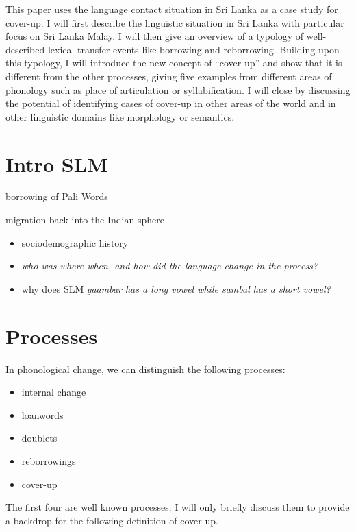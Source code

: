 \documentclass[a4paper,10pt]{article}
\begin{document}
This paper uses the language contact situation in Sri Lanka as a case study for cover-up.
I will first describe the linguistic situation in Sri Lanka with particular focus on Sri Lanka Malay. 
I will then give an overview of a typology of well-described lexical transfer events like borrowing and reborrowing. 
Building upon this typology, I will introduce the new concept of ``cover-up'' and show that it is different from the other processes, giving five examples from different areas of phonology such as place of articulation or syllabification. 
I will close by discussing the potential of identifying cases of cover-up in other areas of the world and in other  linguistic domains like morphology or semantics. 



 

\section{Intro SLM}
borrowing of Pali Words

migration back into the Indian sphere


\begin{itemize} 
 \item  sociodemographic history
 \item  \em who was where when, and how did the language change in the process? \em
 \item why does SLM \em gaambar \em has a long vowel while \em sambal \em has a short vowel?
\end{itemize} 
 

 



\section{Processes}
In phonological change, we can distinguish the following processes:

\begin{itemize}
    \item internal change
    \item loanwords
    \item doublets 
    \item reborrowings
    \item cover-up
\end{itemize}

The first four are well known processes. I will only briefly discuss them to provide a backdrop for the following definition of cover-up.
\end{document}
